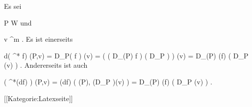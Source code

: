 Es sei

\mavergleichskette
{\vergleichskette
{ P
}
{ \in }{  W
}
{  }{
}
{    }{
}
{   }{
}
}
{}{}{}
und

\mavergleichskette
{\vergleichskette
{ v
}
{ \in }{  \R^m
}
{  }{
}
{    }{
}
{   }{
}
}
{}{}{.}
Es ist einerseits

\mavergleichskettedisp
{\vergleichskette
{ d( \psi^* f) (P,v)
}
{ =} { D_P( f \circ \psi) (v)
}
{ =} { \left(  \left(  D_{\psi(P)} f  \right)  \circ \left(  D_P  \psi  \right)  \right) (v)
}
{ =} { D_{\psi(P)} (f) \left(  D_P \psi(v)  \right)
}
{ } {
}
}
{}{}{.}
Andererseits ist auch

\mavergleichskettedisp
{\vergleichskette
{ \left(  \psi^*(df)  \right) (P,v)
}
{ =} { (df) \left(  \psi(P), (D_P \psi )(v)  \right)
}
{ =} { D_{\psi(P)} (f) \left(  D_P \psi (v)  \right)
}
{ } {
}
{ } {
}
}
{}{}{.}

 [[Kategorie:Latexseite]]
